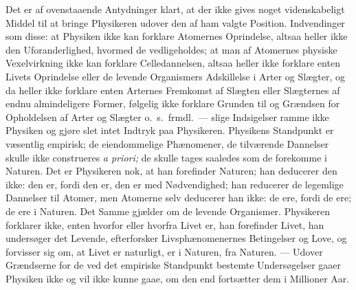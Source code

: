\documentclass[12pt]{book}
\begin{document}
Det er af ovenstaaende Antydninger klart, at der ikke gives noget
videnskabeligt Middel til at bringe Physikeren udover den af ham
valgte Position. Indvendinger som disse: at Physiken ikke kan
forklare Atomernes Oprindelse, altsaa heller ikke den
Uforanderlighed, hvormed de vedligeholdes; at man af Atomernes
physiske Vexelvirkning ikke kan forklare Celledannelsen, altsaa
heller ikke forklare enten Livets Oprindelse eller de levende
Organismers Adskillelse i Arter og Slægter, og da heller ikke
forklare enten Arternes Fremkomst af Slægten eller Slægternes af
endnu almindeligere Former, følgelig ikke
forklare Grunden til og Grændsen for Opholdelsen af Arter og Slægter
o.\ s.\ frmdl.\ --- slige Indsigelser ramme ikke Physiken og gjøre
slet intet Indtryk paa Physikeren. Physikens Standpunkt er væsentlig
empirisk; de eiendommelige Phænomener, de tilværende Dannelser
skulle ikke construeres \textit{a priori;} de skulle tages saaledes
som de forekomme i Naturen. Det er Physikeren nok, at han forefinder
Naturen; han deducerer den ikke: den er, fordi den er, den er med
Nødvendighed; han reducerer de legemlige Dannelser til Atomer, men
Atomerne selv deducerer han ikke: de ere, fordi de ere; de ere i
Naturen. Det Samme gjælder om de levende Organismer. Physikeren
forklarer ikke, enten hvorfor eller hvorfra Livet er, han forefinder
Livet, han undersøger det Levende, efterforsker
Livsphænomenernes Betingelser og Love, og forvisser sig om, at Livet
er naturligt, er i Naturen, fra Naturen. --- Udover Grændserne for
de ved det empiriske Standpunkt bestemte Undersøgelser gaaer
Physiken ikke og vil ikke kunne gaae, om den end fortsætter dem i
Millioner Aar.
\end{document}
